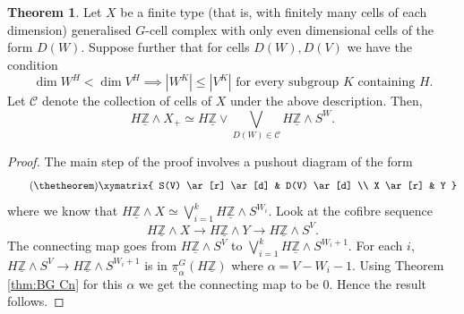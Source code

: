 \documentclass[a4paper,leqno,11pt]{amsart}
\theoremstyle{plain}
\theoremstyle{definition}
\newtheorem{thm}[theorem]{Theorem}
\theoremstyle{remark}
\theoremstyle{definition}
\newcommand\CC{{\mathcal C}}
\newcommand{\ra}{\rightarrow}
\newenvironment{myeq}[1][]
{\stepcounter{theorem}\begin{equation}\tag{\thetheorem}{#1}}
	{\end{equation}}
\newcommand{\uZ}{\underline{\mathbb{Z}}}
\def\a{\alpha}
\def\ra{\rightarrow}
\numberwithin{equation}{section}
\newcommand{\smas}{\wedge}
\begin{document}
	\begin{thm}\label{thmlewis}
		Let $X$ be a finite type (that is, with finitely many cells of each dimension) generalised $G$-cell complex with only even dimensional cells of the form $D(W)$. Suppose further that for cells $D(W), D(V)$ we have the condition 
\[\dim W^H<\dim V^H \implies |W^K|\leq|V^K| \mbox{ for every subgroup } K \mbox{ containing }H.\]
 Let $\CC$ denote the collection of cells of $X$ under the above description. Then,
 $$H\uZ\smas X_+ \simeq H\uZ\vee \bigvee_{D(W)\in \CC}H\uZ \smas S^{W}.$$  
	\end{thm}
	\begin{proof}
		The main step of the proof involves a pushout diagram of the form \begin{myeq}\label{orb-conn-sum-cof}
			\xymatrix{ S(V) \ar[r] \ar[d] & D(V) \ar[d] \\ 
				X \ar[r] & Y }
		\end{myeq}
		where we know that $H\uZ\smas X\simeq\bigvee_{i=1}^{k} H\uZ\smas S^{W_i}$. Look at the cofibre sequence 
$$H\uZ\smas X\to H\uZ\smas Y\to H\uZ\smas S^V.$$ 
		The connecting map goes from $H\uZ\smas S^{V}$ to $\bigvee_{i=1}^{k}H\uZ\smas S^{W_{i} + 1}$. For each $i$, $H\uZ\smas S^{V}\ra H\uZ\smas S^{W_{i} + 1}$ is in $\underline{\pi}_{\a}^{G}(H\uZ)$ where $\a = V - W_{i}-1$. Using Theorem \ref{thm:BG Cn} for this $\a$ we get the connecting map to be $0$. Hence the result follows.
	\end{proof}
\end{document}
